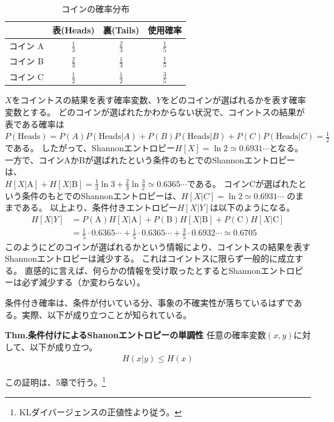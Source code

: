\documentclass[a4paper,11pt]{jsarticle}
\numberwithin{equation}{section}
\begin{document}
\begin{table}[H]
    \centering
    \caption{コインの確率分布}
    \label{tab:coin}
    \begin{tabular}{cccc}
        \toprule
        & 表(Heads) & 裏(Tails) & 使用確率 \\
        \midrule
        コイン A & $\frac{1}{3}$ & $\frac{2}{3}$ & $\frac{1}{5}$ \\
        コイン B & $\frac{2}{3}$ & $\frac{1}{3}$ & $\frac{1}{5}$ \\
        コイン C & $\frac{1}{2}$ & $\frac{1}{2}$ & $\frac{3}{5}$ \\
        \bottomrule
    \end{tabular}
\end{table}

$X$をコイントスの結果を表す確率変数、$Y$をどのコインが選ばれるかを表す確率変数とする。
どのコインが選ばれたかわからない状況で、コイントスの結果が表である確率は\\
$P(\mathrm{Heads}) = P(A) P(\mathrm{Heads}|A) + P(B) P(\mathrm{Heads}|B) + P(C) P(\mathrm{Heads}|C) = \frac{1}{2}$である。
したがって、Shannonエントロピー$H[X]=\ln{2} \simeq 0.6931 \cdots$となる。\\
一方で、コインAかBが選ばれたという条件のもとでのShannonエントロピーは、\\
$H[X|\mathrm{A}] + H[X|\mathrm{B}] = \frac{1}{3} \ln{3} +\frac{2}{3} \ln{\frac{3}{2}} \simeq 0.6365 \cdots$である。
コインCが選ばれたという条件のもとでのShannonエントロピーは、$H[X|C] = \ln{2} \simeq 0.6931 \cdots$ のままである。
以上より、条件付きエントロピー$H[X|Y]$は以下のようになる。
\begin{align}
  H[X|Y] &= P(\mathrm{A})H[X|\mathrm{A}] + P(\mathrm{B})H[X|\mathrm{B}] + P(\mathrm{C})H[X|\mathrm{C}]\\
  &= \frac{1}{5} \cdot 0.6365 \cdots + \frac{1}{5} \cdot 0.6365 \cdots + \frac{3}{5} \cdot 0.6932 \cdots \simeq 0.6705
\end{align}
このようにどのコインが選ばれるかという情報により、コイントスの結果を表すShannonエントロピーは減少する。
これはコイントスに限らず一般的に成立する。
直感的に言えば、何らかの情報を受け取ったとするとShannonエントロピーは必ず減少する（か変わらない）。

条件付き確率は、条件が付いている分、事象の不確実性が落ちているはずである。実際、以下が成り立つことが知られている。
\begin{itembox}[l]{\textbf{Thm.条件付けによるShanonエントロピーの単調性}}
    任意の確率変数$(x,y)$に対して、以下が成り立つ。 
    \begin{align}
        H(x|y) \leq H(x)
    \end{align}
\end{itembox}
この証明は、5章で行う。\footnote{KLダイバージェンスの正値性より従う。}\\
\end{document}
